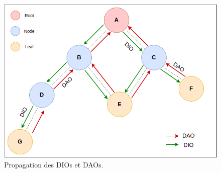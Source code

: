 \begin{figure}[H]
    \centering
    \includegraphics[scale=0.5]{res/dao-dio.drawio.png}
    \caption{Propagation des DIOs et DAOs.}
    \label{fig:state-dio-dao}
\end{figure}




